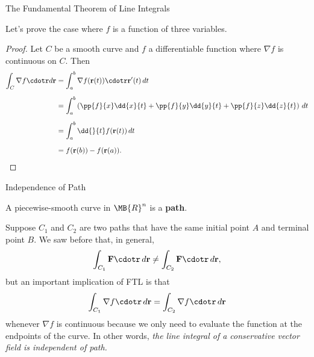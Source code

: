 \documentclass[11pt,english,
handout
]{beamer}
\begin{document}
\begin{frame}[t]{The Fundamental Theorem of Line Integrals}
\small

Let's prove the case where $f$ is a function of three variables.\pause 
\lspace
\begin{proof}
Let $C$ be a smooth curve and $f$ a differentiable function where $\nabla f$ is continuous on $C$. \pause Then
\begin{align*}
\int_C\nabla f\cdotr d\mathbf{r}&=\int_a^b\nabla f(\mathbf{r}(t))\cdotr\mathbf{r}'(t)\,dt\\[2mm]
&=\int_a^b\left(\pp{f}{x}\dd{x}{t}+\pp{f}{y}\dd{y}{t}+\pp{f}{z}\dd{z}{t}\right)\,dt\\[2mm]
&=\int_a^b\dd{}{t}f(\mathbf{r}(t))\,dt\\[2mm]
&=f(\mathbf{r}(b))-f(\mathbf{r}(a)).
\end{align*}\end{proof}
\end{frame}












%



\begin{frame}[t]{Independence of Path}
\small
\begin{definition}
A piecewise-smooth curve in $\MB{R}^n$ is a \textbf{path}.
\end{definition}\pause 

\lspace
Suppose $C_1$ and $C_2$ are two paths that have the same initial point $A$ and terminal point $B$. \pause We saw before that, in general, 
\[
\int_{C_1}\mathbf{F}\cdotr \,d\mathbf{r}\neq\int_{C_2}\mathbf{F}\cdotr\,d\mathbf{r},
\]
but an important implication of FTL is that
\[
\int_{C_1}\nabla f\cdotr\,d\mathbf{r}=\int_{C_2}\nabla f\cdotr\,d\mathbf{r}
\]
whenever $\nabla f$ is continuous because we only need to evaluate the function at the endpoints of the curve. In other words, \textit{the line integral of a conservative vector field is independent of path.}
\end{frame}
\end{document}
